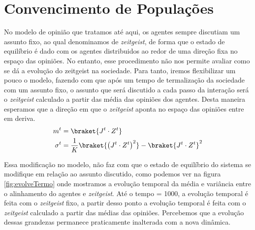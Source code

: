 \chapter{Convencimento de Populações}

No modelo de opinião que tratamos até aqui, os agentes sempre discutiam um assunto fixo, ao qual denominamos de \textit{zeitgeist}, de forma que o estado de equilíbrio é dado com os agentes distribuidos ao redor de uma direção fixa no espaço das opiniões. No entanto, esse procedimento não nos permite avaliar como se dá a evolução do zeitgeist na sociedade.
Para tanto, iremos flexibilizar um pouco o modelo, fazendo com que após um tempo de termalização da sociedade com um assunto fixo, o assunto que será discutido a cada passo da interação será o \textit{zeitgeist} calculado a partir das média das opiniões dos agentes. Desta maneira esperamos que a direção em que o \textit{zeitgeist} aponta no espaço das opiniões entre em deriva. 
\begin{align}
m^t &= \braket{J^t\cdot Z^t} \nonumber \\
\sigma^t &= \frac{1}{K}\braket{\left(J^t\cdot Z^t\right)^2}- \braket{J^t\cdot Z^t}^2 \nonumber \\
\end{align}

 Essa modificação no modelo, não faz com que o estado de equilíbrio do sistema se modifique em relação ao assunto discutido, como podemos ver na figura \ref{fig:evolveTermo} onde mostramos a evolução temporal da média e variância entre o alinhamento do agentes e \textit{zeitgeist}. Até o tempo = 1000, a evolução temporal é feita com o \textit{zeitgeist} fixo, a partir desso ponto a evolução temporal é feita com o \textit{zeitgeist} calculado a partir das médias das opiniões. Percebemos que a evolução dessas grandezas permanece praticamente inalterada com a nova dinâmica.

